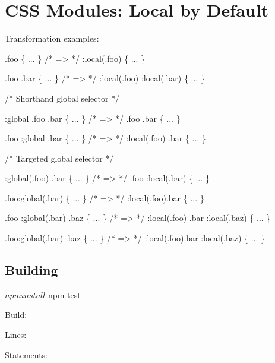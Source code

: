 \href{https://travis-ci.org/css-modules/postcss-modules-local-by-default}{\tt } \href{https://codecov.io/github/css-modules/postcss-modules-local-by-default?branch=master}{\tt } \href{https://www.npmjs.com/package/postcss-modules-local-by-default}{\tt }

\section*{C\+SS Modules\+: Local by Default}

Transformation examples\+:


\begin{DoxyCode}
.foo \{ ... \} /* => */ :local(.foo) \{ ... \}

.foo .bar \{ ... \} /* => */ :local(.foo) :local(.bar) \{ ... \}

/* Shorthand global selector */

:global .foo .bar \{ ... \} /* => */ .foo .bar \{ ... \}

.foo :global .bar \{ ... \} /* => */ :local(.foo) .bar \{ ... \}

/* Targeted global selector */

:global(.foo) .bar \{ ... \} /* => */ .foo :local(.bar) \{ ... \}

.foo:global(.bar) \{ ... \} /* => */ :local(.foo).bar \{ ... \}

.foo :global(.bar) .baz \{ ... \} /* => */ :local(.foo) .bar :local(.baz) \{ ... \}

.foo:global(.bar) .baz \{ ... \} /* => */ :local(.foo).bar :local(.baz) \{ ... \}
\end{DoxyCode}


\subsection*{Building}


\begin{DoxyCode}
$ npm install
$ npm test
\end{DoxyCode}



\begin{DoxyItemize}
\item Build\+: \href{https://travis-ci.org/css-modules/postcss-modules-local-by-default}{\tt }
\item Lines\+: \href{https://coveralls.io/r/css-modules/postcss-modules-local-by-default?branch=master}{\tt }
\item Statements\+: \href{https://codecov.io/github/css-modules/postcss-modules-local-by-default?branch=master}{\tt }
\end{DoxyItemize}

